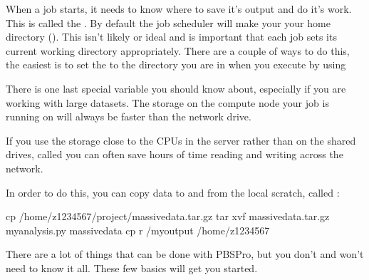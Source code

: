 \documentclass[letterpaper,10pt,english]{sphinxmanual}
\begin{document}
\begin{sphinxVerbatim}[commandchars=\\\{\}]
\end{sphinxVerbatim}

When a job starts, it needs to know where to save it’s output and do it’s work. This is called the . By default the job scheduler will make your  your home directory (). This isn’t likely or ideal and is important that each job sets its current working directory appropriately. There are a couple of ways to do this, the easiest is to set the  to the directory you are in when you execute  by using

\begin{sphinxVerbatim}[commandchars=\\\{\}]
 
\end{sphinxVerbatim}

There is one last special variable you should know about, especially if you are working with large datasets. The storage on the compute node your job is running on will always be faster than the network drive.

If you use the storage close to the CPUs \sphinxhyphen{} in the server rather than on the shared drives, called {\hyperref[\detokenize{glossary:term-Local-Scratch}]{}} \sphinxhyphen{} you can often save hours of time reading and writing across the network.

In order to do this, you can copy data to and from the local scratch, called :

\begin{sphinxVerbatim}[commandchars=\\\{\}]
cp /home/z1234567/project/massivedata.tar.gz 
tar xvf massivedata.tar.gz
my\PYGZus{}analysis.py massive\PYGZus{}data
cp \PYGZhy{}r /my\PYGZus{}output /home/z1234567
\end{sphinxVerbatim}

There are a lot of things that can be done with PBSPro, but you don’t and won’t need to know it all. These few basics will get you started.
\end{document}
